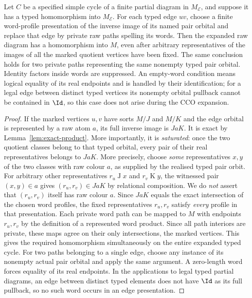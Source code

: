 \begin{lemma}
\label{lem:exact-cycle-lift}
Let $C$ be a specified simple cycle of a finite partial diagram in
$M_{\mathcal E}$, and suppose it has a typed homomorphism into
$M_{\mathcal E}$.  For each typed edge $uv$, choose a finite
word-profile presentation of the inverse image of its named pair
orbital and replace that edge by private raw paths spelling its
words.  Then the expanded raw diagram has a homomorphism into
$M$, even after arbitrary representatives of the images of all the
marked quotient vertices have been fixed.  The same conclusion
holds for two private paths representing the same nonempty typed
pair orbital.  Identity factors inside words are suppressed.  An empty-word
condition means logical equality of its real endpoints and is
handled by their identification; for a legal edge between distinct
typed vertices its nonempty orbital pullback cannot be contained in
$\Id$, so this case does not arise during the CCO expansion.
\end{lemma}
\begin{proof}
If the marked vertices $u,v$ have sorts $M/J$ and $M/K$ and the
edge orbital is represented by a raw atom $a$, its full inverse
image is $JaK$.  It is exact by Lemma~\ref{lem:exact-product}.
More importantly, it is \emph{saturated}: once the two quotient
classes belong to that typed orbital, every pair of their real
representatives belongs to $JaK$.  More precisely, choose \emph{some} representatives $x,y$
of the two classes with raw colour $a$, as supplied by the
realised typed pair orbit.  For arbitrary other representatives
$r_u\mathrel Jx$ and $r_v\mathrel Ky$, the witnessed pair
$(x,y)\in a$ gives $(r_u,r_v)\in JaK$ by relational
composition.  We do \emph{not} assert that $(r_u,r_v)$ itself
has raw colour $a$.  Since $JaK$ equals the exact intersection
of the chosen word profiles, the fixed representatives
$r_u,r_v$ satisfy \emph{every} profile in that presentation.
Each private word path can be mapped to $M$ with endpoints
$r_u,r_v$ by the definition of a represented word product.
Since all path interiors are private, these maps agree on their
only intersections, the marked vertices.  This gives the required
homomorphism simultaneously on the entire expanded typed cycle.
For two paths belonging to a single edge, choose any instance of
its nonempty actual pair orbital and apply the same argument.
A zero-length word forces equality of its real endpoints.
In the applications to legal typed partial diagrams, an edge
between distinct typed elements does not have $\Id$ as its full
pullback, so no such word occurs in an edge presentation.
\end{proof}

